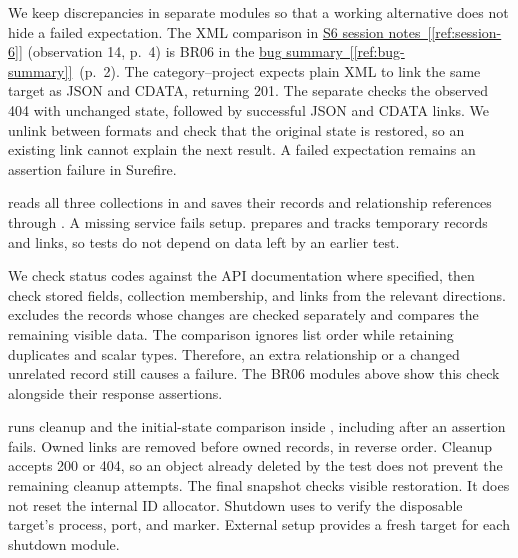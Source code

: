 \documentclass[12pt,letterpaper]{article}
\newcommand{\NotesRef}[1]{%
  \hyperref[ref:session-#1]{S#1 session notes~[\ref*{ref:session-#1}]}}
\newcommand{\BugSummaryRef}{%
  \hyperref[ref:bug-summary]{bug summary~[\ref*{ref:bug-summary}]}}
\begin{document}
We keep discrepancies in separate modules so that a working alternative does
not hide a failed expectation. The XML comparison in \NotesRef{6}
(observation 14, p.~4) is BR06 in the \BugSummaryRef\ (p.~2).
The category--project
 expects plain XML
to link the same target as JSON and CDATA, returning 201. The separate
 checks the
observed 404 with unchanged state, followed by successful JSON and CDATA links.
We unlink between formats and check that the original state is restored, so an
existing link cannot explain the next result. A failed expectation remains an
assertion failure in Surefire.

\NewContentPage
{}
 reads all three collections in
 and saves their records and relationship references through
. A missing service fails setup.
 prepares and tracks temporary records and links, so
tests do not depend on data left by an earlier test.

We check status codes against the API documentation where specified, then check
stored fields, collection membership, and links from the relevant directions.
 excludes the records whose changes
are checked separately and compares the remaining visible data. The comparison
ignores list order while retaining duplicates and scalar types. Therefore, an
extra relationship or a changed unrelated record still causes a failure.
The BR06 modules above show this check alongside their response assertions.

 runs cleanup and the initial-state comparison inside
, including after an assertion fails. Owned links are removed
before owned records, in reverse order. Cleanup accepts 200 or 404, so an object
already deleted by the test does not prevent the remaining cleanup attempts.
The final snapshot checks visible restoration. It does not reset the internal
ID allocator. Shutdown uses 
to verify the disposable target's process, port, and marker. External setup
provides a fresh target for each shutdown module.
\end{document}
